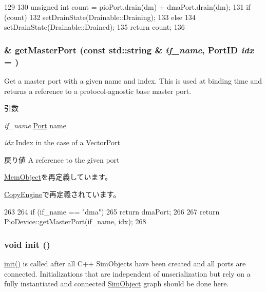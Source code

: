 \begin{DoxyCode}
129 {
130     unsigned int count = pioPort.drain(dm) + dmaPort.drain(dm);
131     if (count)
132         setDrainState(Drainable::Draining);
133     else
134         setDrainState(Drainable::Drained);
135     return count;
136 }
\end{DoxyCode}
\hypertarget{classDmaDevice_adc4e675e51defbdd1e354dac729d0703}{
\subsubsection[{getMasterPort}]{ \& getMasterPort (const std::string \& {\em if\_\-name}, \/  {\bf PortID} {\em idx} = {})}}
\label{classDmaDevice_adc4e675e51defbdd1e354dac729d0703}
Get a master port with a given name and index. This is used at binding time and returns a reference to a protocol-\/agnostic base master port.


\begin{DoxyParams}{引数}
\item[{\em if\_\-name}]\hyperlink{classPort}{Port} name \item[{\em idx}]Index in the case of a VectorPort\end{DoxyParams}
\begin{DoxyReturn}{戻り値}
A reference to the given port 
\end{DoxyReturn}


\hyperlink{classMemObject_adc4e675e51defbdd1e354dac729d0703}{MemObject}を再定義しています。

\hyperlink{classCopyEngine_adc4e675e51defbdd1e354dac729d0703}{CopyEngine}で再定義されています。


\begin{DoxyCode}
263 {
264     if (if_name == "dma") {
265         return dmaPort;
266     }
267     return PioDevice::getMasterPort(if_name, idx);
268 }
\end{DoxyCode}
\hypertarget{classDmaDevice_a02fd73d861ef2e4aabb38c0c9ff82947}{
\subsubsection[{init}]{\setlength{\rightskip}{0pt plus 5cm}void init ()}}
\label{classDmaDevice_a02fd73d861ef2e4aabb38c0c9ff82947}
\hyperlink{classDmaDevice_a02fd73d861ef2e4aabb38c0c9ff82947}{init()} is called after all C++ SimObjects have been created and all ports are connected. Initializations that are independent of unserialization but rely on a fully instantiated and connected \hyperlink{classSimObject}{SimObject} graph should be done here. 


